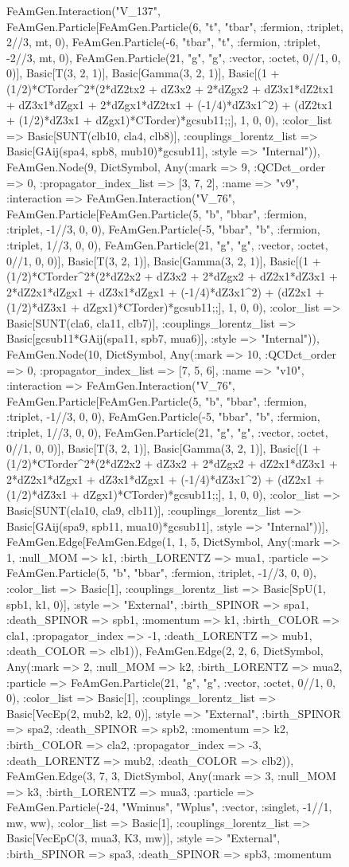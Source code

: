 \documentclass{revtex4}
\begin{document}
\begin{figure}[!htb]
\begin{center}
{FeAmGen.Interaction("V_137", FeAmGen.Particle[FeAmGen.Particle(6, "t", "tbar", :fermion, :triplet, 2//3, mt, 0), FeAmGen.Particle(-6, "tbar", "t", :fermion, :triplet, -2//3, mt, 0), FeAmGen.Particle(21, "g", "g", :vector, :octet, 0//1, 0, 0)], Basic[T(3, 2, 1)], Basic[Gamma(3, 2, 1)], Basic[(1 + (1/2)*CTorder^2*(2*dZ2tx2 + dZ3x2 + 2*dZgx2 + dZ3x1*dZ2tx1 + dZ3x1*dZgx1 + 2*dZgx1*dZ2tx1 + (-1/4)*dZ3x1^2) + (dZ2tx1 + (1/2)*dZ3x1 + dZgx1)*CTorder)*gcsub11;;], 1, 0, 0), :color_list => Basic[SUNT(clb10, cla4, clb8)], :couplings_lorentz_list => Basic[GAij(spa4, spb8, mub10)*gcsub11], :style => "Internal")), FeAmGen.Node(9, Dict{Symbol, Any}(:mark => 9, :QCDct_order => 0, :propagator_index_list => [3, 7, 2], :name => "v9", :interaction => FeAmGen.Interaction("V_76", FeAmGen.Particle[FeAmGen.Particle(5, "b", "bbar", :fermion, :triplet, -1//3, 0, 0), FeAmGen.Particle(-5, "bbar", "b", :fermion, :triplet, 1//3, 0, 0), FeAmGen.Particle(21, "g", "g", :vector, :octet, 0//1, 0, 0)], Basic[T(3, 2, 1)], Basic[Gamma(3, 2, 1)], Basic[(1 + (1/2)*CTorder^2*(2*dZ2x2 + dZ3x2 + 2*dZgx2 + dZ2x1*dZ3x1 + 2*dZ2x1*dZgx1 + dZ3x1*dZgx1 + (-1/4)*dZ3x1^2) + (dZ2x1 + (1/2)*dZ3x1 + dZgx1)*CTorder)*gcsub11;;], 1, 0, 0), :color_list => Basic[SUNT(cla6, cla11, clb7)], :couplings_lorentz_list => Basic[gcsub11*GAij(spa11, spb7, mua6)], :style => "Internal")), FeAmGen.Node(10, Dict{Symbol, Any}(:mark => 10, :QCDct_order => 0, :propagator_index_list => [7, 5, 6], :name => "v10", :interaction => FeAmGen.Interaction("V_76", FeAmGen.Particle[FeAmGen.Particle(5, "b", "bbar", :fermion, :triplet, -1//3, 0, 0), FeAmGen.Particle(-5, "bbar", "b", :fermion, :triplet, 1//3, 0, 0), FeAmGen.Particle(21, "g", "g", :vector, :octet, 0//1, 0, 0)], Basic[T(3, 2, 1)], Basic[Gamma(3, 2, 1)], Basic[(1 + (1/2)*CTorder^2*(2*dZ2x2 + dZ3x2 + 2*dZgx2 + dZ2x1*dZ3x1 + 2*dZ2x1*dZgx1 + dZ3x1*dZgx1 + (-1/4)*dZ3x1^2) + (dZ2x1 + (1/2)*dZ3x1 + dZgx1)*CTorder)*gcsub11;;], 1, 0, 0), :color_list => Basic[SUNT(cla10, cla9, clb11)], :couplings_lorentz_list => Basic[GAij(spa9, spb11, mua10)*gcsub11], :style => "Internal"))], FeAmGen.Edge[FeAmGen.Edge(1, 1, 5, Dict{Symbol, Any}(:mark => 1, :null_MOM => k1, :birth_LORENTZ => mua1, :particle => FeAmGen.Particle(5, "b", "bbar", :fermion, :triplet, -1//3, 0, 0), :color_list => Basic[1], :couplings_lorentz_list => Basic[SpU(1, spb1, k1, 0)], :style => "External", :birth_SPINOR => spa1, :death_SPINOR => spb1, :momentum => k1, :birth_COLOR => cla1, :propagator_index => -1, :death_LORENTZ => mub1, :death_COLOR => clb1)), FeAmGen.Edge(2, 2, 6, Dict{Symbol, Any}(:mark => 2, :null_MOM => k2, :birth_LORENTZ => mua2, :particle => FeAmGen.Particle(21, "g", "g", :vector, :octet, 0//1, 0, 0), :color_list => Basic[1], :couplings_lorentz_list => Basic[VecEp(2, mub2, k2, 0)], :style => "External", :birth_SPINOR => spa2, :death_SPINOR => spb2, :momentum => k2, :birth_COLOR => cla2, :propagator_index => -3, :death_LORENTZ => mub2, :death_COLOR => clb2)), FeAmGen.Edge(3, 7, 3, Dict{Symbol, Any}(:mark => 3, :null_MOM => k3, :birth_LORENTZ => mua3, :particle => FeAmGen.Particle(-24, "Wminus", "Wplus", :vector, :singlet, -1//1, mw, ww), :color_list => Basic[1], :couplings_lorentz_list => Basic[VecEpC(3, mua3, K3, mw)], :style => "External", :birth_SPINOR => spa3, :death_SPINOR => spb3, :momentum }
\end{center}
\end{figure}
\end{document}
